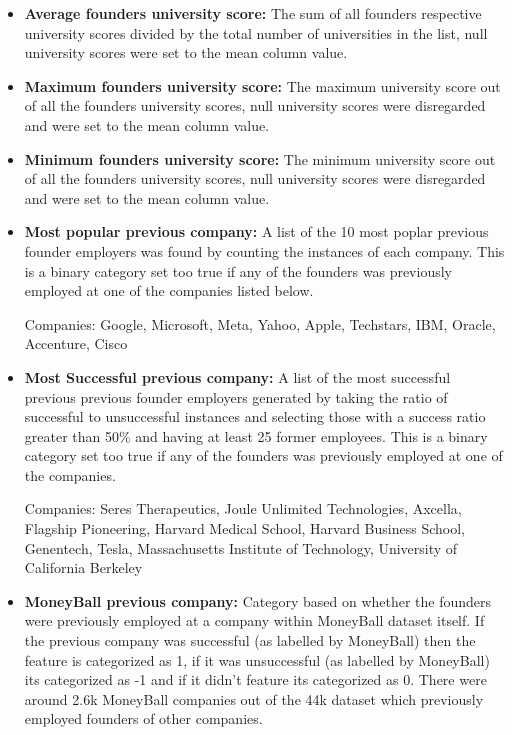 \documentclass{article}
\begin{document}
\begin{itemize}
	\item\textbf{Average founders university score:} The sum of all founders respective university scores divided by the total number of universities in the list, null university scores were set to the mean column value.
	
	\item\textbf{Maximum founders university score:} The maximum university score out of all the founders university scores, null university scores were disregarded and were set to the mean column value.
	
	\item\textbf{Minimum founders university score:} The minimum university score out of all the founders university scores, null university scores were disregarded and were set to the mean column value.
	
	\item\textbf{Most popular previous company:} A list of the 10 most poplar previous founder employers was found by counting the instances of each company. This is a binary category set too true if any of the founders was previously employed at one of the companies listed below.  

	Companies: Google, Microsoft, Meta, Yahoo, Apple, Techstars, IBM, Oracle, Accenture, Cisco
	
	\item\textbf{Most Successful previous company:} A list of the most successful previous previous founder employers generated by taking the ratio of successful to unsuccessful instances and selecting those with a success ratio greater than 50\% and having at least 25 former employees. This is a binary category set too true if any of the founders was previously employed at one of the companies.  
	
	Companies: Seres Therapeutics, Joule Unlimited Technologies, Axcella, Flagship Pioneering, Harvard Medical School, Harvard Business School, Genentech, Tesla, Massachusetts Institute of Technology, University of California Berkeley

	\item\textbf{MoneyBall previous company:} Category based on whether the founders were previously employed at a company within MoneyBall dataset itself. If the previous company was successful (as labelled by MoneyBall) then the feature is categorized as 1, if it was unsuccessful (as labelled by MoneyBall) its categorized as -1 and if it didn't feature its categorized as 0. There were around 2.6k MoneyBall companies out of the 44k dataset which previously employed founders of other companies. 
		
\end{itemize}
\end{document}
